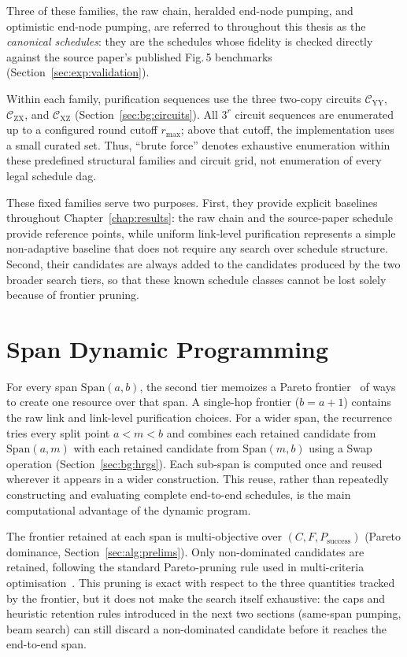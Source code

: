 Three of these families, the raw chain, heralded end-node pumping, and optimistic end-node pumping, are referred to throughout this thesis as the \emph{canonical schedules}: they are the schedules whose fidelity is checked directly against the source paper's published Fig.\,5 benchmarks (Section~\ref{sec:exp:validation}).

Within each family, purification sequences use the three two-copy circuits $\mathcal C_{\mathrm{YY}}$, $\mathcal C_{\mathrm{ZX}}$, and $\mathcal C_{\mathrm{XZ}}$ (Section~\ref{sec:bg:circuits}). All $3^r$ circuit sequences are enumerated up to a configured round cutoff $r_{\max}$; above that cutoff, the implementation uses a small curated set. Thus, ``brute force'' denotes exhaustive enumeration within these predefined structural families and circuit grid, not enumeration of every legal schedule \Gls{dag}.

These fixed families serve two purposes. First, they provide explicit baselines throughout Chapter~\ref{chap:results}: the raw chain and the source-paper schedule provide reference points, while uniform link-level purification represents a simple non-adaptive baseline that does not require any search over schedule structure. Second, their candidates are always added to the candidates produced by the two broader search tiers, so that these known schedule classes cannot be lost solely because of frontier pruning.

\section{Span Dynamic Programming}
\label{sec:alg:dp}

For every span $\mathrm{Span}(a,b)$, the second tier memoizes a Pareto frontier~\cite{Pareto2014Manual} of ways to create one resource over that span. A single-hop frontier ($b=a+1$) contains the raw link and link-level purification choices. For a wider span, the recurrence tries every split point $a<m<b$ and combines each retained candidate from $\mathrm{Span}(a,m)$ with each retained candidate from $\mathrm{Span}(m,b)$ using a Swap operation (Section~\ref{sec:bg:hrgs}). Each sub-span is computed once and reused wherever it appears in a wider construction. This reuse, rather than repeatedly constructing and evaluating complete end-to-end schedules, is the main computational advantage of the dynamic program.

The frontier retained at each span is multi-objective over $(C,F,P_{\mathrm{success}})$ (Pareto dominance, Section~\ref{sec:alg:prelims}). Only non-dominated candidates are retained, following the standard Pareto-pruning rule used in multi-criteria optimisation~\cite{Ehrgott2005Multicriteria}. This pruning is exact with respect to the three quantities tracked by the frontier, but it does not make the search itself exhaustive: the caps and heuristic retention rules introduced in the next two sections (same-span pumping, beam search) can still discard a non-dominated candidate before it reaches the end-to-end span.

